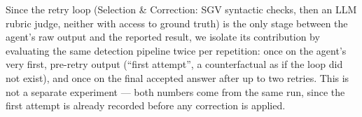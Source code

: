 
Since the retry loop (Selection \& Correction: SGV syntactic checks,
then an LLM rubric judge, neither with access to ground truth) is the
only stage between the agent's raw output and the reported result, we
isolate its contribution by evaluating the same detection pipeline
twice per repetition: once on the agent's very first, pre-retry output
(``first attempt'', a counterfactual as if the loop did not exist), and
once on the final accepted answer after up to two retries. This is not
a separate experiment — both numbers come from the same run, since the
first attempt is already recorded before any correction is applied.

